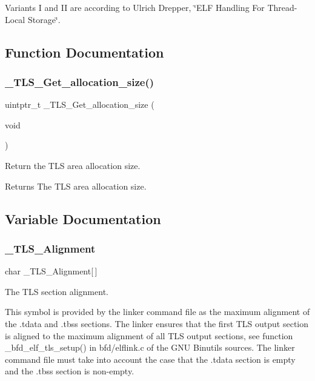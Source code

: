 Variants I and II are according to Ulrich Drepper, \char`\"{}\+E\+L\+F Handling For
\+Thread-\/\+Local Storage\char`\"{}. 

\subsection{Function Documentation}
\mbox{\label{group__RTEMSScoreTLS_ga895642c73096b9995106694f3b0832d5}} 
\subsubsection{\texorpdfstring{\_TLS\_Get\_allocation\_size()}{\_TLS\_Get\_allocation\_size()}}
{\footnotesize\ttfamily uintptr\+\_\+t \+\_\+\+T\+L\+S\+\_\+\+Get\+\_\+allocation\+\_\+size (\begin{DoxyParamCaption}\item[{void}]{ }\end{DoxyParamCaption})}



Return the T\+LS area allocation size. 

\begin{DoxyReturn}{Returns}
The T\+LS area allocation size. 
\end{DoxyReturn}


\subsection{Variable Documentation}
\mbox{\label{group__RTEMSScoreTLS_ga1d89186d2fe1619171ff1987d032cf6b}} 
\subsubsection{\texorpdfstring{\_TLS\_Alignment}{\_TLS\_Alignment}}
{\footnotesize\ttfamily char \+\_\+\+T\+L\+S\+\_\+\+Alignment\mbox{[}$\,$\mbox{]}}



The T\+LS section alignment. 

This symbol is provided by the linker command file as the maximum alignment of the .tdata and .tbss sections. The linker ensures that the first T\+LS output section is aligned to the maximum alignment of all T\+LS output sections, see function \+\_\+bfd\+\_\+elf\+\_\+tls\+\_\+setup() in bfd/elflink.\+c of the G\+NU Binutils sources. The linker command file must take into account the case that the .tdata section is empty and the .tbss section is non-\/empty. 